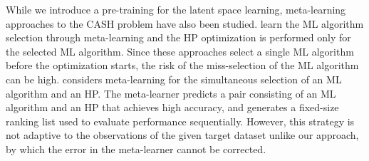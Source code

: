 While we introduce a pre-training for the latent space learning, meta-learning \cite{lemke2015metalearning} approaches to the CASH problem have also been studied.
%
\cite{mu2022auto,wang2020auto} learn the ML algorithm selection through meta-learning and the HP optimization is performed only for the selected ML algorithm.
%
Since these approaches select a single ML algorithm before the optimization starts, the risk of the miss-selection of the ML algorithm can be high.
%
\cite{dagan2024automated,cohen2019autogrd,laadan2019rankml} considers meta-learning for the simultaneous selection of an ML algorithm and an HP.
%
The meta-learner predicts a pair consisting of an ML algorithm and an HP that achieves high accuracy, and generates a fixed-size ranking list used to evaluate performance sequentially.
%
However, this strategy is not adaptive to the observations of the given target dataset unlike our approach, by which the error in the meta-learner cannot be corrected. %


